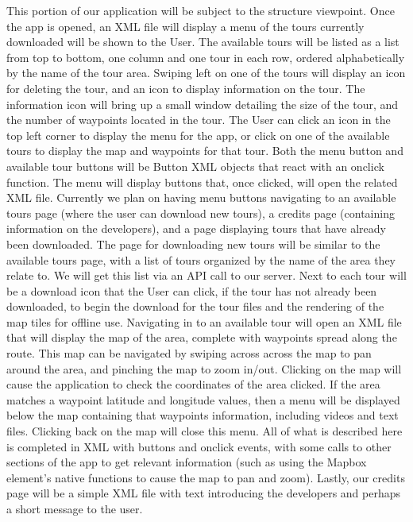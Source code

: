 \documentclass[letterpaper, 10pt,titlepage]{article}
\begin{document}
This portion of our application will be subject to the structure viewpoint. Once the app is opened, an XML file will display a menu of the tours currently downloaded will be shown to the User. The available tours will be listed as a list from top to bottom, one column and one tour in each row, ordered alphabetically by the name of the tour area. Swiping left on one of the tours will display an icon for deleting the tour, and an icon to display information on the tour. The information icon will bring up a small window detailing the size of the tour, and the number of waypoints located in the tour. The User can click an icon in the top left corner to display the menu for the app, or click on one of the available tours to display the map and waypoints for that tour. Both the menu button and available tour buttons will be Button XML objects that react with an onclick function. The menu will display buttons that, once clicked, will open the related XML file. Currently we plan on having menu buttons navigating to an available tours page (where the user can download new tours), a credits page (containing information on the developers), and a page displaying tours that have already been downloaded. The page for downloading new tours will be similar to the available tours page, with a list of tours organized by the name of the area they relate to. We will get this list via an API call to our server. Next to each tour will be a download icon that the User can click, if the tour has not already been downloaded, to begin the download for the tour files and the rendering of the map tiles for offline use. Navigating in to an available tour will open an XML file that will display the map of the area, complete with waypoints spread along the route. This map can be navigated by swiping across across the map to pan around the area, and pinching the map to zoom in/out. Clicking on the map will cause the application to check the coordinates of the area clicked. If the area matches a waypoint latitude and longitude values, then a menu will be displayed below the map containing that waypoints information, including videos and text files. Clicking back on the map will close this menu. All of what is described here is completed in XML with buttons and onclick events, with some calls to other sections of the app to get relevant information (such as using the Mapbox element’s native functions to cause the map to pan and zoom). Lastly, our credits page will be a simple XML file with text introducing the developers and perhaps a short message to the user.
\end{document}
